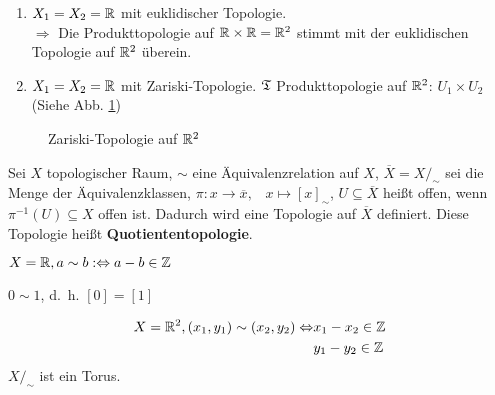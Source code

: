 \begin{beispiel}
    \begin{enumerate}[1)]
        \item $X_1 = X_2 = \mathbb{R}$ mit euklidischer Topologie.\\
              $\Rightarrow$ Die Produkttopologie auf $\mathbb{R} \times \mathbb{R} = \mathbb{R}^2$
              stimmt mit der euklidischen Topologie auf $\mathbb{R}^2$ überein.
        \item $X_1 = X_2 = \mathbb{R}$ mit Zariski-Topologie.
              $\mathfrak{T}$ Produkttopologie auf $\mathbb{R}^2$: $U_1 \times U_2$\\
              (Siehe Abb. \ref{fig:zariski-topologie})
    \end{enumerate}

    \begin{figure}[htp]
        \centering
        
        \caption{Zariski-Topologie auf $\mathbb{R}^2$}
        \label{fig:zariski-topologie}
    \end{figure}
\end{beispiel}

\begin{definition} 
    Sei $X$ topologischer Raum, $\sim$ eine Äquivalenzrelation auf $X$,
    $\overline{X} = X /_\sim$ sei die Menge der Äquivalenzklassen,
    $\pi: x \rightarrow \overline{x}, \;\;\; x \mapsto [x]_\sim$,
    $U \subseteq \overline{X}$ heißt offen, wenn $\pi^{-1} (U) \subseteq X$
    offen ist. Dadurch wird eine Topologie auf $\overline{X}$ definiert.
    Diese Topologie heißt \textbf{Quotiententopologie}.
\end{definition}

\begin{beispiel}
    $X = \mathbb{R}, a \sim b :\Leftrightarrow a-b \in \mathbb{Z}$
    
    

    $0 \sim 1$, d.~h. $[0] = [1]$
\end{beispiel}

\begin{beispiel}
    \begin{align*}
        X = \mathbb{R}^2, (x_1, y_1) \sim (x_2, y_2) \Leftrightarrow &x_1 - x_2 \in \mathbb{Z}\\
                                                   &y_1 - y_2 \in \mathbb{Z}
    \end{align*}
    $X /_\sim$ ist ein Torus.
\end{beispiel}


